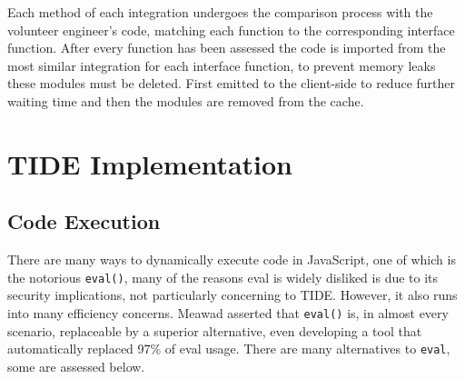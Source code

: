 \documentclass[jou,apacite]{apa6}
\begin{document}
Each method of each integration undergoes the comparison process with the volunteer engineer's code, matching each function to the corresponding interface function. After every function has been assessed the code is imported from the most similar integration for each interface function, to prevent memory leaks these modules must be deleted. First emitted to the client-side to reduce further waiting time and then the modules are removed from the cache.

\section{TIDE Implementation}
\subsection{Code Execution}
There are many ways to dynamically execute code in JavaScript, one of which is the notorious \texttt{eval()}, many of the reasons eval is widely disliked is due to its security implications, not particularly concerning to TIDE. However,  it also runs into many efficiency concerns. Meawad \cite{Meawad2012} asserted that \texttt{eval()} is, in almost every scenario, replaceable by a superior alternative, even developing a tool that automatically replaced 97\% of eval usage. There are many alternatives to \texttt{eval}, some are assessed below.
\end{document}
